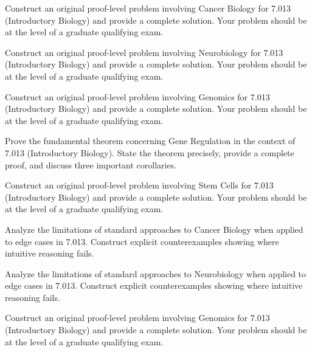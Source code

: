 \documentclass[12pt,a4paper]{exam}
\begin{document}
\begin{questions}
\vspace{0.3cm}

\question[10]
Construct an original proof-level problem involving Cancer Biology for 7.013 (Introductory Biology) and provide a complete solution. Your problem should be at the level of a graduate qualifying exam.

\vspace{0.3cm}

\question[3]
Construct an original proof-level problem involving Neurobiology for 7.013 (Introductory Biology) and provide a complete solution. Your problem should be at the level of a graduate qualifying exam.

\vspace{0.3cm}

\question[3]
Construct an original proof-level problem involving Genomics for 7.013 (Introductory Biology) and provide a complete solution. Your problem should be at the level of a graduate qualifying exam.

\vspace{0.3cm}

\question[4]
Prove the fundamental theorem concerning Gene Regulation in the context of 7.013 (Introductory Biology). State the theorem precisely, provide a complete proof, and discuss three important corollaries.

\vspace{0.3cm}

\question[3]
Construct an original proof-level problem involving Stem Cells for 7.013 (Introductory Biology) and provide a complete solution. Your problem should be at the level of a graduate qualifying exam.

\vspace{0.3cm}

\question[5]
Analyze the limitations of standard approaches to Cancer Biology when applied to edge cases in 7.013. Construct explicit counterexamples showing where intuitive reasoning fails.

\vspace{0.3cm}

\question[2]
Analyze the limitations of standard approaches to Neurobiology when applied to edge cases in 7.013. Construct explicit counterexamples showing where intuitive reasoning fails.

\vspace{0.3cm}

\question[3]
Construct an original proof-level problem involving Genomics for 7.013 (Introductory Biology) and provide a complete solution. Your problem should be at the level of a graduate qualifying exam.


\end{questions}
\end{document}
